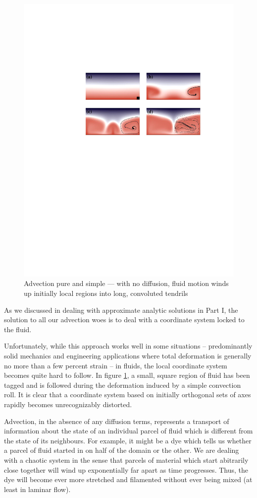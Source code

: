 \documentclass[10pt]{article}
\begin{document}
		\begin{figure}[h]           
			\begin{center}
	 			 \includegraphics[width=0.66\linewidth]{Diagrams/advect_mix.pdf}
	 			\caption[]{Advection pure and simple --- with no diffusion, fluid
	 			motion winds up initially local regions into long, convoluted tendrils}
	 			\label{fig:adv1}
	 		\end{center}
		\end{figure}
		
	As we discussed in dealing with approximate analytic solutions in Part I, the
	solution to all our advection woes is to deal with a coordinate system locked to 
	the fluid.
	
	Unfortunately, while this approach works well in some situations -- predominantly solid
	mechanics and engineering applications where total deformation is generally no more
	than a few percent strain -- in fluids, the local coordinate system becomes quite
	hard to follow. In figure \ref{fig:adv1}, a small, square region of fluid has been tagged
	and is followed during the deformation induced by a simple convection roll.
	It is clear that a coordinate system based on initially orthogonal sets of axes 
	rapidly becomes unrecognizably distorted. 

	Advection, in the absence of any diffusion terms, represents a transport of information
	about the state of an individual parcel of fluid which is different from the state of its neighbours.
	For example, it might be a dye which tells us whether a parcel of fluid started in
	on half of the domain or the other. 
	We are dealing with a chaotic system in the sense that parcels of material which start abitrarily close
	together will wind up exponentially far apart as time progresses. Thus, the dye
	will become ever more stretched and filamented without ever being mixed (at least in 
	laminar flow).    
	
\end{document}
